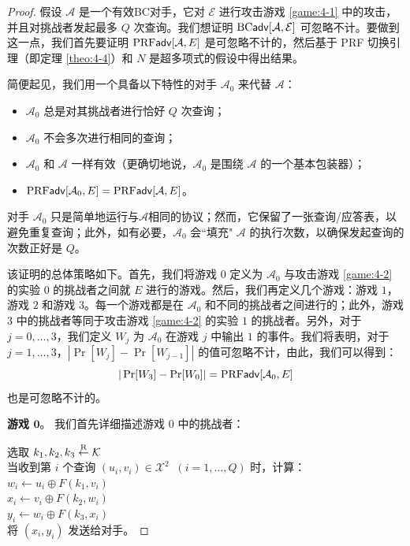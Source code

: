 \begin{proof}
假设 $\mathcal{A}$ 是一个有效BC对手，它对 $\mathcal{E}$ 进行攻击游戏 \ref{game:4-1} 中的攻击，并且对挑战者发起最多 $Q$ 次查询。我们想证明 ${\rm BC\mathsf{adv}}[\mathcal{A},\mathcal{E}]$ 可忽略不计。要做到这一点，我们首先要证明 ${\rm PRF\mathsf{adv}}[\mathcal{A}, E]$ 是可忽略不计的，然后基于 PRF 切换引理（即定理 \ref{theo:4-4}）和 $N$ 是超多项式的假设中得出结果。

简便起见，我们用一个具备以下特性的对手 $\mathcal{A}_0$ 来代替 $\mathcal{A}$：
\begin{itemize}
	\item $\mathcal{A}_0$ 总是对其挑战者进行恰好 $Q$ 次查询；
	\item $\mathcal{A}_0$ 不会多次进行相同的查询；
	\item $\mathcal{A}_0$ 和 $\mathcal{A}$ 一样有效（更确切地说，$\mathcal{A}_0$ 是围绕 $\mathcal{A}$ 的一个基本包装器）；
	\item ${\rm PRF\mathsf{adv}}[\mathcal{A}_0, E]={\rm PRF\mathsf{adv}}[\mathcal{A}, E]$。
\end{itemize}
对手 $\mathcal{A}_0$ 只是简单地运行与$\mathcal{A}$相同的协议；然而，它保留了一张查询/应答表，以避免重复查询；此外，如有必要，$\mathcal{A}_0$ 会``填充" $\mathcal{A}$ 的执行次数，以确保发起查询的次数正好是 $Q$。

该证明的总体策略如下。首先，我们将游戏 $0$ 定义为 $\mathcal{A}_0$ 与攻击游戏 \ref{game:4-2} 的实验 $0$ 的挑战者之间就 $E$ 进行的游戏。然后，我们再定义几个游戏：游戏 $1$，游戏 $2$ 和游戏 $3$。每一个游戏都是在 $\mathcal{A}_0$ 和不同的挑战者之间进行的；此外，游戏 $3$ 中的挑战者等同于攻击游戏 \ref{game:4-2} 的实验 $1$ 的挑战者。另外，对于 $j=0,\dots,3$，我们定义 $W_j$ 为 $\mathcal{A}_0$ 在游戏 $j$ 中输出 $1$ 的事件。我们将表明，对于 $j=1,\dots,3$，$|\Pr[W_j]-\Pr[W_{j-1}]|$ 的值可忽略不计，由此，我们可以得到：
\[
|\Pr[W_3]-\Pr[W_0]|={\rm PRF\mathsf{adv}}[\mathcal{A}_0, E]
\]
也是可忽略不计的。

\vspace{5pt}

\noindent
\textbf{游戏 $\mathbf{0}$}。
我们首先详细描述游戏 $0$ 中的挑战者：

\vspace{5pt}

\hspace*{5pt} 选取 $k_1,k_2,k_3\overset{\rm R}\leftarrow\mathcal{K}$\\
\hspace*{26pt} 当收到第 $i$ 个查询 $(u_i,v_i)\in\mathcal{X}^2\;\;(i=1,\dots,Q)$ 时，计算：\\
\hspace*{50pt} $w_i\leftarrow u_i\oplus F(k_1,v_i)$\\
\hspace*{50pt} $x_i\leftarrow v_i\oplus F(k_2,w_i)$\\
\hspace*{50pt} $y_i\leftarrow w_i\oplus F(k_3,x_i)$\\
\hspace*{50pt} 将 $(x_i,y_i)$ 发送给对手。


\end{proof}
